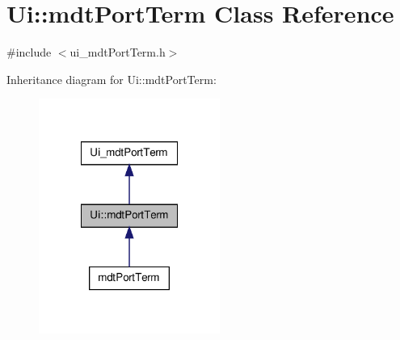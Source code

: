 \hypertarget{class_ui_1_1mdt_port_term}{\section{Ui\-:\-:mdt\-Port\-Term Class Reference}
\label{class_ui_1_1mdt_port_term}
}


{\ttfamily \#include $<$ui\-\_\-mdt\-Port\-Term.\-h$>$}



Inheritance diagram for Ui\-:\-:mdt\-Port\-Term\-:\nopagebreak
\begin{figure}[H]
\begin{center}
\leavevmode
\includegraphics[width=168pt]{class_ui_1_1mdt_port_term__inherit__graph}
\end{center}
\end{figure}


